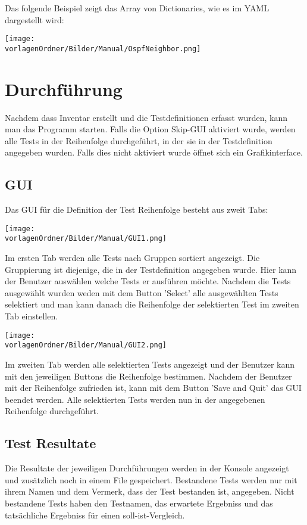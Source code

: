 \documentclass[
	ngerman,
	toc=listof, %
	toc=bibliography, %
	footnotes=multiple, %
	parskip=half, %
	numbers=noendperiod %
]{scrartcl}
\newcommand{\vorlagenOrdner}{../99_Vorlagen} %
\begin{document}
			Das folgende Beispiel zeigt das Array von Dictionaries, wie es im YAML dargestellt wird:

			\texttt{[image: \\vorlagenOrdner/Bilder/Manual/OspfNeighbor.png]}

\section{Durchführung}
	Nachdem dass Inventar erstellt und die Testdefinitionen erfasst wurden,
	kann man das Programm starten.
	Falls die Option Skip-GUI aktiviert wurde, werden alle Tests in der Reihenfolge durchgeführt,
	in der sie in der Testdefinition angegeben wurden. 
	Falls dies nicht aktiviert wurde öffnet sich ein Grafikinterface.

	\subsection{GUI}
		Das GUI für die Definition der Test Reihenfolge besteht aus zweit Tabs:

		\texttt{[image: \\vorlagenOrdner/Bilder/Manual/GUI1.png]}

		Im ersten Tab werden alle Tests nach Gruppen sortiert angezeigt.
		Die Gruppierung ist diejenige, die in der Testdefinition angegeben wurde. 
		Hier kann der Benutzer auswählen welche Tests er ausführen möchte.
		Nachdem die Tests ausgewählt wurden weden mit dem Button 'Select' 
		alle ausgewählten Tests selektiert und man kann danach die Reihenfolge der
		selektierten Test im zweiten Tab einstellen.

		\texttt{[image: \\vorlagenOrdner/Bilder/Manual/GUI2.png]}

		Im zweiten Tab werden alle selektierten Tests angezeigt und der Benutzer 
		kann mit den jeweiligen Buttons die Reihenfolge bestimmen.
		Nachdem der Benutzer mit der Reihenfolge zufrieden ist,
		kann mit dem Button 'Save and Quit' das GUI beendet werden.
		Alle selektierten Tests werden nun in der angegebenen Reihenfolge durchgeführt.

	\subsection{Test Resultate}
		Die Resultate der jeweiligen Durchführungen werden in der Konsole angezeigt 
		und zusätzlich noch in einem File gespeichert.
		Bestandene Tests werden nur mit ihrem Namen und dem Vermerk, dass der Test bestanden ist,
		angegeben. 
		Nicht bestandene Tests haben den Testnamen, das erwartete Ergebniss und das tatsächliche
		Ergebniss für einen soll-ist-Vergleich.
\end{document}

